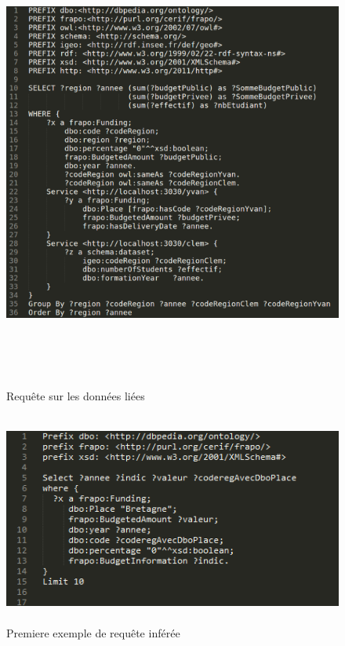\documentclass[a4paper,sffamily,12pt]{article}
\begin{document}
		\begin{figure}[!h]

			\vspace{0.5cm}			
			\centerline{\includegraphics[height=15cm]{picture/linked_query.png}}
			\caption{Requête sur les données liées}
			\label{linkedQ}
			
		\end{figure}	
			
		\newpage		

		\begin{figure}[!h]

			\vspace{0.5cm}			
			\centerline{\includegraphics[height=7cm]{picture/inference1.png}}
			\caption{Premiere exemple de requête inférée}
			\label{inf1}
			
		\end{figure}		
	
\end{document}
